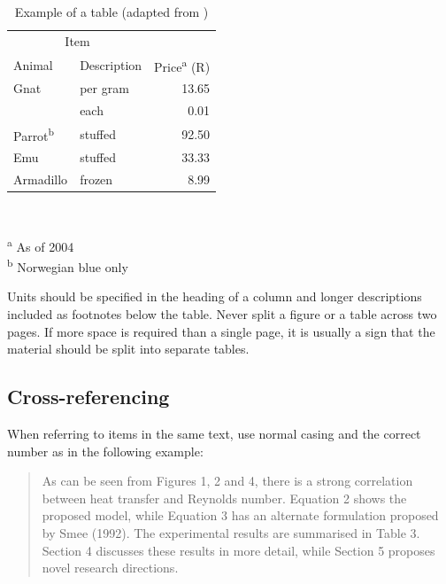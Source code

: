 \documentclass[a5paper, 10pt]{article}
\begin{document}
\begin{table}[htbp]
  \centering
  \caption{Example of a table (adapted from \citet{fear})}
  \label{tab:tabexample}
  \begin{minipage}{0.5\textwidth}
    \begin{centering}
      \begin{tabular}{@{}llr@{}} \toprule 
        \multicolumn{2}{c}{Item} \\ \cmidrule(r){1-2} 
        Animal & Description & Price\textsuperscript{a} (R)\\ \midrule 
        Gnat & per gram & \num{13.65} \\ 
        & each & \num{0.01} \\ 
        Parrot\textsuperscript{b} & stuffed & \num{92.50} \\ 
        Emu & stuffed & \num{33.33} \\ 
        Armadillo & frozen & \num{8.99} \\ \bottomrule 
      \end{tabular} \\
    \end{centering} 
    \vspace{1em}
    \textsuperscript{a} As of 2004 \\
    \textsuperscript{b} Norwegian blue only
  \end{minipage}
\end{table}

Units should be specified in the heading of a column and longer descriptions included as footnotes below the table.
Never split a figure or a table across two pages.
If more space is required than a single page, it is usually a sign that the material should be split into separate tables.

\subsection{Cross-referencing}
When referring to items in the same text, use normal casing and the
correct number as in the following example:

\begin{quote}
  As can be seen from Figures 1, 2 and 4, there is a strong
  correlation between heat transfer and Reynolds number.  Equation 2
  shows the proposed model, while Equation 3 has an alternate
  formulation proposed by Smee (1992).  The experimental results are
  summarised in Table 3.  Section 4 discusses these results in more
  detail, while Section 5 proposes novel research directions.
\end{quote}
\end{document}
